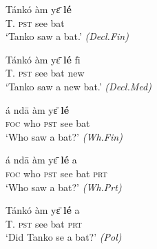\documentclass[output=paper,newtxmath,modfonts,nonflat,hidelinks]{langsci/langscibook}
\begin{document}

\ea\label{ex:gjersoe:testsentences}
\gll Tánkó àm y{\=ɛ} \textbf{lé}\\ 
T. \textsc{pst} see bat\\
\glt `Tanko saw a bat.' \hfill \textit{(Decl.Fin)}
\z


\ea
\gll Tánkó àm y{\=ɛ} \textbf{lé} f\={\i}\\
T. \textsc{pst} see bat new\\
\glt `Tanko saw a new bat.' \hfill \textit{(Decl.Med)}
\z


\ea
\gll á nd\={a} àm y{\=ɛ} \textbf{lé}\\
\textsc{foc} who \textsc{pst} see bat\\
\glt `Who saw a bat?' \hfill \textit{(Wh.Fin)}
\z


\ea
\gll á nd\={a} àm y{\=ɛ} \textbf{lé} a\\
\textsc{foc} who \textsc{pst} see  bat \textsc{prt}\\
\glt `Who saw a bat?' \hfill \textit{(Wh.Prt)}
\z


\ea\label{ex:gjersoe:testsentencesII}
\gll  Tánkó àm y{\=ɛ} \textbf{lé} a\\
T. \textsc{pst} see bat \textsc{prt}\\
\glt `Did Tanko se a bat?' \hfill \textit{(Pol)}
\z
\end{document}
